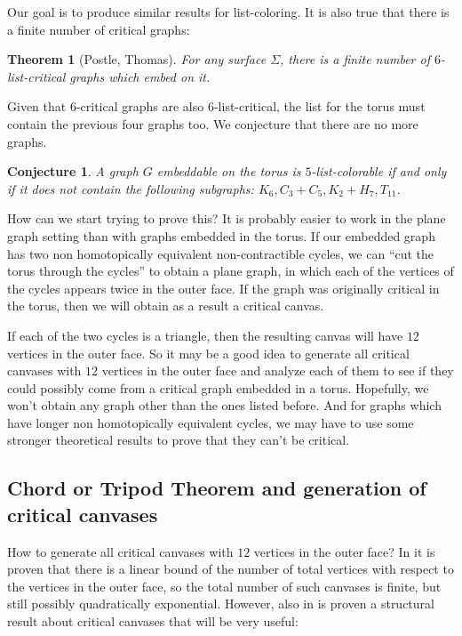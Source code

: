 \documentclass{article}
\newtheorem{theorem}{Theorem}
\newtheorem{conjecture}{Conjecture}
\begin{document}
Our goal is to produce similar results for list-coloring. It is also true that there is a finite number of critical graphs:

\begin{theorem}[Postle, Thomas]
For any surface $\Sigma$, there is a finite number of $6$-list-critical graphs which embed on it.
\end{theorem}

Given that $6$-critical graphs are also $6$-list-critical, the list for the torus must contain the previous four graphs too. We conjecture that there are no more graphs.

\begin{conjecture}
A graph $G$ embeddable on the torus is $5$-list-colorable if and only if it does not contain the following subgraphs: $K_6, C_3 + C_5, K_2 + H_7, T_{11}$.
\end{conjecture}


How can we start trying to prove this? It is probably easier to work in the plane graph setting than with graphs embedded in the torus. If our embedded graph has two non homotopically equivalent non-contractible cycles, we can ``cut the torus through the cycles'' to obtain a plane graph, in which each of the vertices of the cycles appears twice in the outer face. If the graph was originally critical in the torus, then we will obtain as a result a critical canvas.

If each of the two cycles is a triangle, then the resulting canvas will have $12$ vertices in the outer face. So it may be a good idea to generate all critical canvases with $12$ vertices in the outer face and analyze each of them to see if they could possibly come from a critical graph embedded in a torus. Hopefully, we won't obtain any graph other than the ones listed before. And for graphs which have longer non homotopically equivalent cycles, we may have to use some stronger theoretical results to prove that they can't be critical.


\subsection{Chord or Tripod Theorem and generation of critical canvases}

How to generate all critical canvases with $12$ vertices in the outer face? In \cite{fivelistcoloring2} it is proven that there is a linear bound of the number of total vertices with respect to the vertices in the outer face, so the total number of such canvases is finite, but still possibly quadratically exponential. However, also in \cite{fivelistcoloring2} is proven a structural result about critical canvases that will be very useful:
\end{document}
